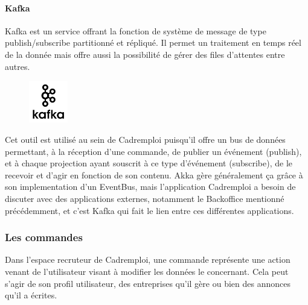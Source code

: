 \paragraph{Kafka}
\label{par:Kafka}
Kafka est un service offrant la fonction de système de message de type publish/subscribe partitionné et répliqué.
Il permet un traitement en temps réel de la donnée mais offre aussi la possibilité de gérer des files d'attentes entre autres.
\begin{figure}
  \begin{center}
    \includegraphics[width=0.15\textwidth]{Pictures/kafka_logo.jpg}
  \end{center}
\end{figure}
Cet outil est utilisé au sein de Cadremploi puisqu'il offre un bus de données permettant, à la réception d'une commande, de publier un événement (publish), et à chaque projection ayant souscrit à ce type d'événement (subscribe), de le recevoir et d'agir en fonction de son contenu.
Akka gère généralement ça grâce à son implementation d'un EventBus, mais l'application Cadremploi a besoin de discuter avec des applications externes, notamment le Backoffice mentionné précédemment, et c'est Kafka qui fait le lien entre ces différentes applications.



\subsubsection{Les commandes}
\label{subs:Les commandes}
Dans l'espace recruteur de Cadremploi, une commande représente une action venant de l'utilisateur visant à modifier les données le concernant.
Cela peut s'agir de son profil utilisateur, des entreprises qu'il gère ou bien des annonces qu'il a écrites.

